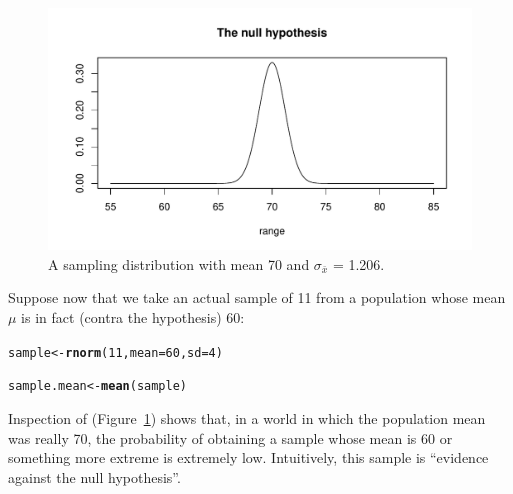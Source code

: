 \documentclass[12pt]{book}\usepackage[]{graphicx}\usepackage[]{color}
\makeatletter
\def\maxwidth{ %
  \ifdim\Gin@nat@width>\linewidth
    \linewidth
  \else
    \Gin@nat@width
  \fi
}
\newcommand{\hlnum}[1]{\textcolor[rgb]{0.686,0.059,0.569}{#1}}%
\newcommand{\hlstd}[1]{\textcolor[rgb]{0.345,0.345,0.345}{#1}}%
\newcommand{\hlkwb}[1]{\textcolor[rgb]{0.69,0.353,0.396}{#1}}%
\newcommand{\hlkwc}[1]{\textcolor[rgb]{0.333,0.667,0.333}{#1}}%
\newcommand{\hlkwd}[1]{\textcolor[rgb]{0.737,0.353,0.396}{\textbf{#1}}}%
\newenvironment{kframe}{%
 \def\at@end@of@kframe{}%
 \ifinner\ifhmode%
  \def\at@end@of@kframe{\end{minipage}}%
  \begin{minipage}{\columnwidth}%
 \fi\fi%
 \def\FrameCommand##1{\hskip\@totalleftmargin \hskip-\fboxsep
 \colorbox{shadecolor}{##1}\hskip-\fboxsep
     \hskip-\linewidth \hskip-\@totalleftmargin \hskip\columnwidth}%
 \MakeFramed {\advance\hsize-\width
   \@totalleftmargin\z@ \linewidth\hsize
   \@setminipage}}%
 {\par\unskip\endMakeFramed%
 \at@end@of@kframe}
\newenvironment{knitrout}{}{} %
\makeatother
\begin{document}
\begin{figure}[!htbp]
  \centering
\begin{knitrout}
\color{fgcolor}
\includegraphics[width=\maxwidth]{figure/unnamed-chunk-40-1} 

\end{knitrout}
\caption{A sampling distribution with mean 70 and $\sigma_{\bar{x}}$ =
1.206.} \label{fig:nullhypexample}
\end{figure}

Suppose now
that we take an actual sample of 11 from a population whose mean $\mu$ is in fact (contra the hypothesis)
60:

\begin{knitrout}
\color{fgcolor}\begin{kframe}
\begin{alltt}
\hlstd{sample} \hlkwb{<-} \hlkwd{rnorm}\hlstd{(}\hlnum{11}\hlstd{,}\hlkwc{mean}\hlstd{=}\hlnum{60}\hlstd{,}\hlkwc{sd}\hlstd{=}\hlnum{4}\hlstd{)}
\end{alltt}
\end{kframe}
\end{knitrout}

\begin{knitrout}
\color{fgcolor}\begin{kframe}
\begin{alltt}
\hlstd{sample.mean} \hlkwb{<-} \hlkwd{mean}\hlstd{(sample)}
\end{alltt}
\end{kframe}
\end{knitrout}



Inspection of (Figure~\ref{fig:nullhypexample}) shows that, in a world
in which the population mean was really 70, the probability of obtaining a sample whose mean is 60 or something more extreme is extremely low. Intuitively, this sample is ``evidence against the null hypothesis''.
\end{document}
